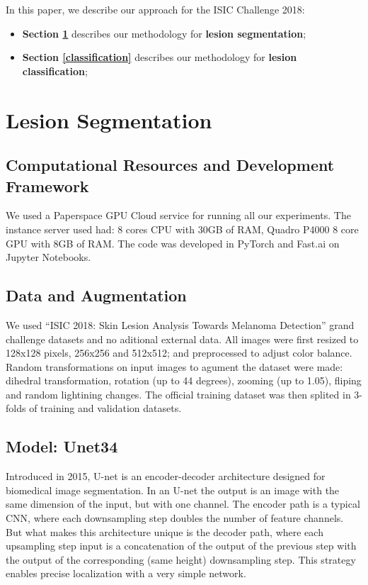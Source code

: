 \documentclass[conference]{IEEEtran}
\begin{document}
In this paper, we describe our approach for the ISIC Challenge 2018:
\begin{itemize}
\item \textbf{Section \ref{segmentation}} describes our methodology for \textbf{lesion segmentation};
\item \textbf{Section \ref{classification}} describes our methodology for \textbf{lesion classification};
\end{itemize}


\section{Lesion Segmentation}
\label{segmentation}
\subsection{Computational Resources and Development Framework\label{resources}}
We used a Paperspace GPU Cloud service for running all our experiments. The instance server used had: 8 cores CPU with 30GB of RAM, Quadro P4000 8 core GPU with 8GB of RAM. 
The code was developed in PyTorch and Fast.ai\cite{fastai} on Jupyter Notebooks.
\subsection{Data and Augmentation}
We used “ISIC 2018: Skin Lesion Analysis Towards Melanoma Detection” grand challenge datasets \cite{codella, ham} and no aditional external data. All images were first resized to 128x128 pixels, 256x256 and 512x512; and preprocessed to adjust color balance. Random transformations on input images to agument the dataset were made: dihedral transformation, rotation (up to 44 degrees), zooming (up to 1.05), fliping and random lightining changes. The official training dataset was then splited in 3-folds of training and validation datasets.  

\subsection{Model: Unet34}
Introduced in 2015, U-net is an encoder-decoder architecture designed for biomedical image segmentation\cite{olaf}. In an U-net the output is an image with the same dimension of the input, but with one channel.  The encoder path is a typical CNN, where each downsampling step doubles the number of feature channels. But what makes this architecture unique is the decoder path, where each upsampling step input is a concatenation of the output of the previous step with the output of the corresponding (same height) downsampling step. This strategy enables precise localization with a very simple network. 
\end{document}
